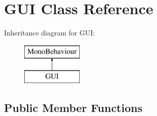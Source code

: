\hypertarget{class_g_u_i}{}\section{G\+U\+I Class Reference}
\label{class_g_u_i}
Inheritance diagram for G\+U\+I\+:\begin{figure}[H]
\begin{center}
\leavevmode
\includegraphics[height=2.000000cm]{class_g_u_i}
\end{center}
\end{figure}
\subsection*{Public Member Functions}
